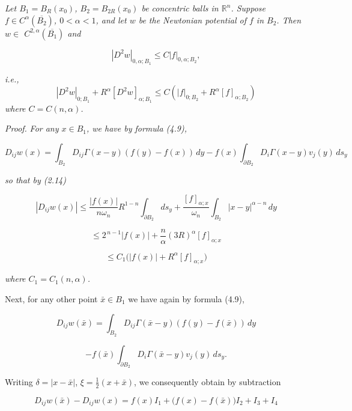 \begin{lemma}\label{gt:lem-newtonian-holder-ball}
\textit{Let $B_1 = B_R(x_0)$, $B_2 = B_{2R}(x_0)$ be concentric balls in $\mathbb{R}^n$. Suppose
$f \in C^\alpha(\overline{B_2})$, $0<\alpha<1$, and let $w$ be the Newtonian potential of $f$ in $B_2$. Then $w \in$
$C^{2,\alpha}(\overline{B_1})$ and}

\begin{equation}
\tag{4.11}
\left|D^2 w\right|_{0,\alpha;B_1} \leq C\left|f\right|_{0,\alpha;B_2},
\end{equation}

\textit{i.e.,}
\[
\left|D^2 w\right|_{0;B_1} + R^\alpha \left[D^2 w\right]_{\alpha;B_1}
\leq C\left(\left|f\right|_{0;B_2} + R^\alpha \left[f\right]_{\alpha;B_2}\right)
\]
\textit{where $C = C(n,\alpha)$.}

\textit{Proof.} \textit{For any $x \in B_1$, we have by formula (4.9),}

\[
D_{ij}w(x)=\int_{B_2} D_{ij}\Gamma(x-y)(f(y)-f(x))\,dy-f(x)\int_{\partial B_2} D_i\Gamma(x-y)v_j(y)\,ds_y
\]

\textit{so that by (2.14)}

\begin{equation}
\tag{4.12}
\left|D_{ij}w(x)\right|
\leq \frac{|f(x)|}{n\omega_n}R^{1-n}\int_{\partial B_2}ds_y
+ \frac{[f]_{\alpha;x}}{\omega_n}\int_{B_2}|x-y|^{\alpha-n}\,dy
\end{equation}

\[
\leq 2^{\,n-1}|f(x)| + \frac{n}{\alpha}(3R)^\alpha [f]_{\alpha;x}
\]

\[
\leq C_1\bigl(|f(x)| + R^\alpha [f]_{\alpha;x}\bigr)
\]

\textit{where $C_1 = C_1(n,\alpha)$.}
\par
\noindent Next, for any other point $\bar{x} \in B_1$ we have again by formula (4.9),

\[
D_{ij}w(\bar{x})=\int_{B_2} D_{ij}\Gamma(\bar{x}-y)(f(y)-f(\bar{x}))\,dy
\]

\[
-f(\bar{x})\int_{\partial B_2} D_i\Gamma(\bar{x}-y)v_j(y)\,ds_y.
\]

\noindent Writing $\delta = |x-\bar{x}|$, $\xi = \frac{1}{2}(x+\bar{x})$, we consequently obtain by subtraction

\[
D_{ij}w(\bar{x})-D_{ij}w(x)=f(x)I_1+\bigl(f(x)-f(\bar{x})\bigr)I_2+I_3+I_4
\]


\end{lemma}
